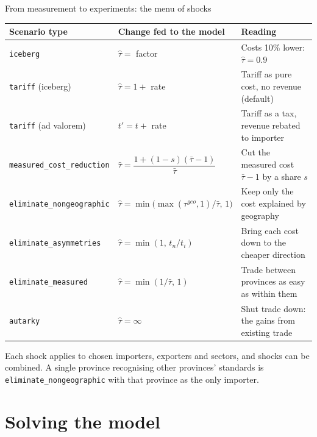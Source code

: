 \documentclass[aspectratio=169,9pt,t]{beamer}
\newcommand{\h}[1]{\hat{#1}}
\begin{document}
\begin{frame}{From measurement to experiments: the menu of shocks}
  \small
  \begin{tabular}{@{}L{0.27\textwidth}L{0.3\textwidth}L{0.37\textwidth}@{}}
    \toprule
    Scenario type & Change fed to the model & Reading\\
    \midrule
    \texttt{iceberg} & $\h\tau=$ factor & Costs 10\% lower:
      $\h\tau=0.9$\\
    \addlinespace
    \texttt{tariff} (iceberg) & $\h\tau=1+$ rate & Tariff as pure cost, no
      revenue (default)\\
    \addlinespace
    \texttt{tariff} (ad valorem) & $t'=t+$ rate & Tariff as a tax, revenue
      rebated to importer\\
    \addlinespace
    \texttt{measured\_cost\_reduction} & $\h\tau=\dfrac{1+(1-s)(\bar\tau-1)}{\bar\tau}$
      & Cut the measured cost $\bar\tau-1$ by a share $s$\\
    \addlinespace
    \texttt{eliminate\_nongeographic} & $\h\tau=\min\!\big(\max(\tau^{geo},1)/\bar\tau,\,1\big)$
      & Keep only the cost explained by geography\\
    \addlinespace
    \texttt{eliminate\_asymmetries} & $\h\tau=\min(1,\,t_n/t_i)$
      & Bring each cost down to the cheaper direction\\
    \addlinespace
    \texttt{eliminate\_measured} & $\h\tau=\min(1/\bar\tau,\,1)$
      & Trade between provinces as easy as within them\\
    \addlinespace
    \texttt{autarky} & $\h\tau=\infty$ & Shut trade down: the gains from
      existing trade\\
    \bottomrule
  \end{tabular}

  \medskip
  Each shock applies to chosen importers, exporters and sectors, and
  shocks can be combined. A single province recognising other provinces'
  standards is \texttt{eliminate\_nongeographic} with that province as the
  only importer.
\end{frame}

\section{Solving the model}
\end{document}
